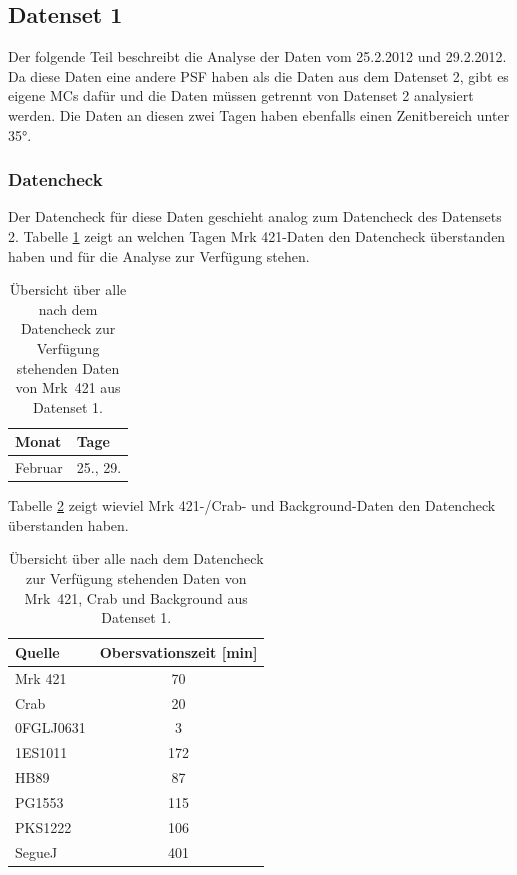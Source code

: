 \FloatBarrier

\subsection{Datenset 1}
\label{subsec:Datenset_1}
Der folgende Teil beschreibt die Analyse der Daten vom 25.2.2012 und 29.2.2012.
Da diese Daten eine andere PSF haben als die Daten aus dem Datenset 2, gibt es eigene MCs dafür und die Daten müssen getrennt von Datenset 2 analysiert werden.
Die Daten an diesen zwei Tagen haben ebenfalls einen Zenitbereich unter 35°.

\subsubsection{Datencheck}
Der Datencheck für diese Daten geschieht analog zum Datencheck des Datensets 2. 
Tabelle \ref{tab:Datenset1-Mrk421} zeigt an welchen Tagen Mrk 421-Daten den Datencheck überstanden haben und für die Analyse zur Verfügung stehen. 

\begin{table}[!h]
\centering
\caption{Übersicht über alle nach dem Datencheck zur Verfügung stehenden Daten von Mrk~421 aus Datenset 1.}
\label{tab:Datenset1-Mrk421}
\begin{tabular}{ll}
  \toprule
  Monat & Tage\\
  \midrule
  \midrule
Februar & 25., 29.\\
  \bottomrule
\end{tabular}
\end{table}


Tabelle \ref{tab:Datenset1} zeigt wieviel Mrk 421-/Crab- und Background-Daten den Datencheck überstanden haben.


\begin{table}[!h]
\centering
\caption{Übersicht über alle nach dem Datencheck zur Verfügung stehenden Daten von Mrk~421, Crab und Background aus Datenset 1.}
\label{tab:Datenset1}
\begin{tabular}{lc}
  \toprule
  Quelle & Obersvationszeit [min]\\
  \midrule
  \midrule
  Mrk 421 & 70\\
  \midrule
  Crab & 20\\
  \midrule
  0FGLJ0631 & 3 \\
  1ES1011 & 172 \\
  HB89 & 87 \\
  PG1553 & 115 \\
  PKS1222 & 106 \\
  SegueJ & 401 \\
  \bottomrule
  \bottomrule
\end{tabular}
\end{table}

